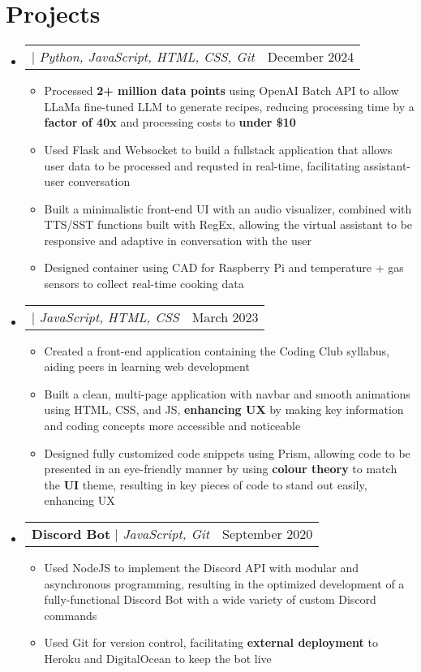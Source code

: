 \documentclass[letterpaper,11pt]{article}
\makeatletter
\newcommand{\resumeItem}[1]{
  \item\small{
    {#1 \vspace{0pt}}
  }
}
\newcommand{\resumeProjectHeading}[2]{
    \item
    \begin{tabular*}{0.97\textwidth}{l@{\extracolsep{\fill}}r}
      \small#1 & #2 \\
    \end{tabular*}\vspace{-7pt}
}
\newcommand{\resumeSubHeadingListStart}{\begin{itemize}[leftmargin=0.15in, label={}]}
\newcommand{\resumeSubHeadingListEnd}{\end{itemize}}
\newcommand{\resumeItemListStart}{\begin{itemize}}
\newcommand{\resumeItemListEnd}{\end{itemize}\vspace{-8pt}}
\makeatother
\begin{document}
 \vspace{-10pt}



\section{Projects}
  \resumeSubHeadingListStart
    \resumeProjectHeading
        {\textbf{\href{https://youtu.be/q-WvIjfFc7Q?si=JN_DYJyrR8w8-lbQ}{\underbar{AI Cooking Assistant}}} $|$ \emph{Python, JavaScript, HTML, CSS, Git}}{December 2024}
        \resumeItemListStart
          \resumeItem{Processed \textbf{2+ million data points} using OpenAI Batch API to allow LLaMa fine-tuned LLM to generate recipes, reducing processing time by a \textbf{factor of 40x} and processing costs to \textbf{under \$10}}
          \resumeItem{Used Flask and Websocket to build a fullstack application that allows user data to be processed and requsted in real-time, facilitating assistant-user conversation}
          \resumeItem{Built a minimalistic front-end UI with an audio visualizer, combined with TTS/SST functions built with RegEx, allowing the virtual assistant to be responsive and adaptive in conversation with the user}
          \resumeItem{Designed container using CAD for Raspberry Pi and temperature + gas sensors to collect real-time cooking data}
        \resumeItemListEnd
        \vspace{-2pt}
    \resumeProjectHeading
        {\textbf{\href{https://garfieldfluffjr.github.io/Parkdale-WebDev-Club/}{\underbar{Coding Club Website}}} $|$ \emph{JavaScript, HTML, CSS}}{March 2023}
        \resumeItemListStart
          \resumeItem{Created a front-end application containing the Coding Club syllabus, aiding peers in learning web development}
          \resumeItem{Built a clean, multi-page application with navbar and smooth animations using HTML, CSS, and JS, \textbf{enhancing UX} by making key information and coding concepts more accessible and noticeable}
          \resumeItem{Designed fully customized code snippets using Prism, allowing code to be presented in an eye-friendly manner by using \textbf{colour theory} to match the \textbf{UI} theme, resulting in key pieces of code to stand out easily, enhancing UX}
        \resumeItemListEnd
        \vspace{-2pt}
    \resumeProjectHeading
      {\textbf{Discord Bot} $|$ \emph{JavaScript, Git}}{September 2020}
      \resumeItemListStart
        \resumeItem{Used NodeJS to implement the Discord API with modular and asynchronous programming, resulting in the optimized development of a fully-functional Discord Bot with a wide variety of custom Discord commands}
        \resumeItem{Used Git for version control, facilitating \textbf{external deployment} to Heroku and DigitalOcean to keep the bot live}
      \resumeItemListEnd
  \resumeSubHeadingListEnd
\end{document}
